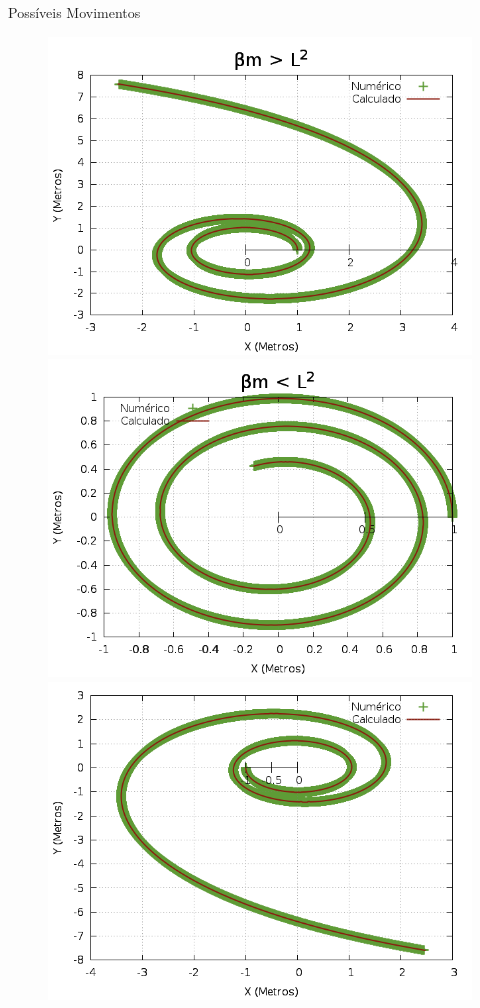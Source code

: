 \documentclass[a4paper,12pt]{exam}
\begin{document}
		Possíveis Movimentos
		
		\begin{figure}[l]
			\centering
			\includegraphics[scale=0.3]{3o0.png}
			\includegraphics[scale=0.3]{3o1.png}
			\includegraphics[scale=0.3]{3o2.png}

\end{figure}
\end{document}
